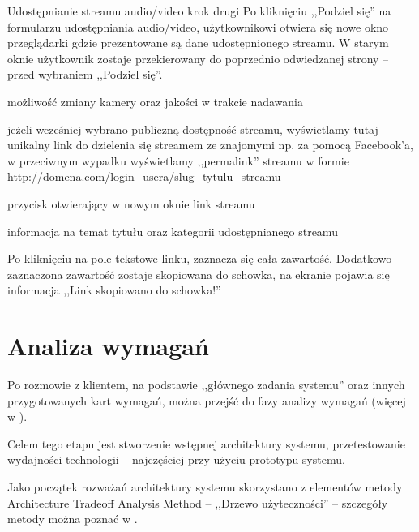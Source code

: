 \begin{userstory}{Udostępnianie streamu audio/video krok drugi}
    Po kliknięciu ,,Podziel się'' na formularzu udostępniania audio/video, użytkownikowi otwiera się nowe okno przeglądarki gdzie prezentowane są dane udostępnionego streamu. W starym oknie użytkownik zostaje przekierowany do poprzednio odwiedzanej strony -- przed wybraniem ,,Podziel się''.
    \begin{packed_enum}
        \item{możliwość zmiany kamery oraz jakości w trakcie nadawania}
        \item{jeżeli wcześniej wybrano publiczną dostępność streamu, wyświetlamy tutaj unikalny link do dzielenia się streamem ze znajomymi np. za pomocą Facebook'a, w przeciwnym wypadku wyświetlamy ,,permalink'' streamu w formie \url{http://domena.com/login_usera/slug_tytulu_streamu}}
        \item{przycisk otwierający w nowym oknie link streamu}
        \item{informacja na temat tytułu oraz kategorii udostępnianego streamu}
    \end{packed_enum}
    \begin{tests}
        \item{Po kliknięciu na pole tekstowe linku, zaznacza się cała zawartość. Dodatkowo zaznaczona zawartość zostaje skopiowana do schowka, na ekranie pojawia się informacja ,,Link skopiowano do schowka!''}
    \end{tests}
\end{userstory}

\section{Analiza wymagań}
\label{sec:EtapIaw}

Po rozmowie z klientem, na podstawie ,,głównego zadania systemu'' oraz innych przygotowanych kart wymagań, można przejść do fazy analizy wymagań (więcej w ).

Celem tego etapu jest stworzenie wstępnej architektury systemu, przetestowanie wydajności technologii -- najczęściej przy użyciu prototypu systemu.

Jako początek rozważań architektury systemu skorzystano z elementów metody Architecture Tradeoff Analysis Method -- ,,Drzewo użyteczności'' -- szczegóły metody można poznać w \cite{Kaz2000}.

